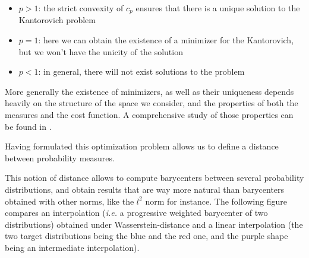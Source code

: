 \begin{itemize}
    \item $p > 1$: the strict convexity of $c_p$ ensures that there is a
    unique solution to the Kantorovich problem
    \item $p = 1$: here we can obtain the existence of a minimizer for the
    Kantorovich, but we won't have the unicity of the solution
    \item $p < 1$: in general, there will not exist solutions to the problem
\end{itemize}

More generally the existence of minimizers, as well as their uniqueness
depends heavily on the structure of the space we consider, and the properties
of both the measures and the cost function. A comprehensive study of those
properties can be found in \cite{villani2003topics}.


Having formulated this optimization problem allows us to define a distance
between probability measures.


This notion of distance allows to compute barycenters between several
probability distributions, and obtain results that are way more natural
than barycenters obtained with other norms, like the $l^2$ norm for
instance. The following figure compares an interpolation (\emph{i.e.}
a progressive weighted barycenter of two distributions) obtained under
Wasserstein-distance and a linear interpolation (the two target distributions
being the blue and the red one, and the purple shape being an intermediate
interpolation).

